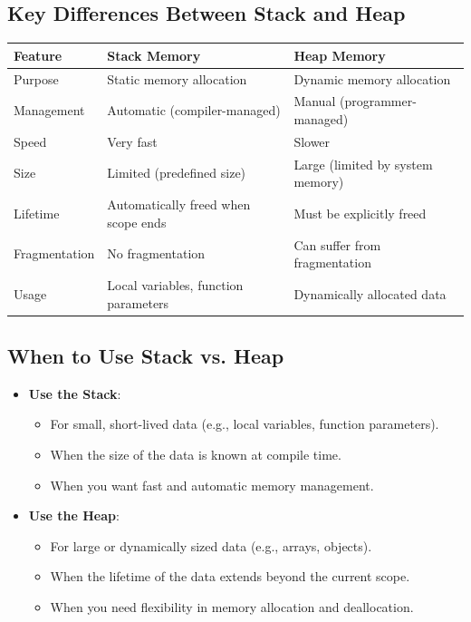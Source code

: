 \subsection{Key Differences Between Stack and Heap}

\begin{tabular}{|l|l|l|}
    \hline
    \textbf{Feature} & \textbf{Stack Memory} & \textbf{Heap Memory} \\ \hline
    Purpose & Static memory allocation & Dynamic memory allocation \\ \hline
    Management & Automatic (compiler-managed) & Manual (programmer-managed) \\ \hline
    Speed & Very fast & Slower \\ \hline
    Size & Limited (predefined size) & Large (limited by system memory) \\ \hline
    Lifetime & Automatically freed when scope ends & Must be explicitly freed \\ \hline
    Fragmentation & No fragmentation & Can suffer from fragmentation \\ \hline
    Usage & Local variables, function parameters & Dynamically allocated data \\ \hline
\end{tabular}

\subsection{When to Use Stack vs. Heap}

\begin{itemize}
    \item \textbf{Use the Stack}:
    \begin{itemize}
        \item For small, short-lived data (e.g., local variables, function parameters).
        \item When the size of the data is known at compile time.
        \item When you want fast and automatic memory management.
    \end{itemize}
    \item \textbf{Use the Heap}:
    \begin{itemize}
        \item For large or dynamically sized data (e.g., arrays, objects).
        \item When the lifetime of the data extends beyond the current scope.
        \item When you need flexibility in memory allocation and deallocation.
    \end{itemize}
\end{itemize}


